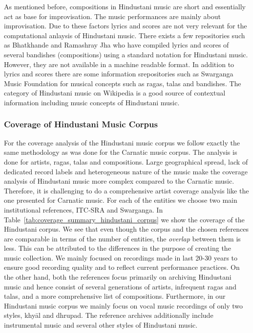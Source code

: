 As mentioned before, compositions in Hindustani music are short and essentially act as base for improvisation. The music performances are mainly about improvisation. Due to these factors lyrics and scores are not very relevant for the computational anlaysis of Hindustani music. There exists a few repositories such as Bhatkhande and Ramashray Jha who have compiled lyrics and scores of several bandishes (compositions) using a standard notation for Hindustani music. However, they are not available in a machine readable format. In addition to lyrics and scores there are some information srepositories such as Swarganga Music Foundation  for musical concepts such as \glspl{raga}, \glspl{tala} and bandishes. The category of Hindustani music on Wikipedia is a good source of contextual information including music concepts of Hindustani music.

\subsubsection{Coverage of Hindustani Music Corpus}
\label{sec:corpus_coverage_of_hindustani_music_corpus}

For the coverage analysis of the Hindustani music corpus we follow exactly the same methodology as was done for the Carnatic music corpus. The analysis is done for artists, \glspl{raga}, \glspl{tala} and compositions. Large geographical spread, lack of dedicated record labels and heterogeneous nature of the music make the coverage analysis of Hindustani music more complex compared to the Carnatic music. Therefore, it is challenging to do a comprehensive artist coverage analysis like the one presented for Carnatic music. For each of the entities we choose two main institutional references, ITC-SRA and Swarganga. In  Table~\ref{tab:coverage_summary_hindustani_corpus} we show the coverage of the Hindustani corpus. We see that even though the corpus and the chosen references are comparable in terms of the number of entities, the \textit{overlap} between them is less. This can be attributed to the differences in the purpose of creating the music collection. We mainly focused on recordings made in last 20-30 years to ensure good recording quality and to reflect current performance practices. On the other hand, both the references focus primarily on archiving Hindustani music and hence consist of several generations of artists, infrequent \glspl{raga} and \glspl{tala}, and a more comprehensive list of compositions. Furthermore, in our Hindustani music corpus we mainly focus on vocal music recordings of only two styles, khy\={a}l and dhrupad. The reference archives additionally include instrumental music and several other styles of Hindustani music.



